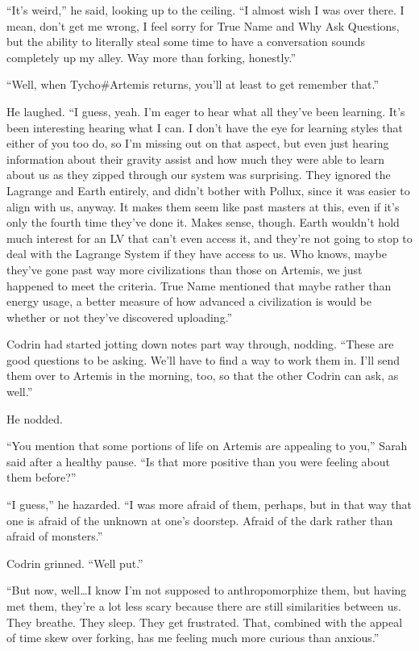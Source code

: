 ``It's weird,'' he said, looking up to the ceiling. ``I almost wish I was over there. I mean, don't get me wrong, I feel sorry for True Name and Why Ask Questions, but the ability to literally steal some time to have a conversation sounds completely up my alley. Way more than forking, honestly.''

``Well, when Tycho\#Artemis returns, you'll at least to get remember that.''

He laughed. ``I guess, yeah. I'm eager to hear what all they've been learning. It's been interesting hearing what I can. I don't have the eye for learning styles that either of you too do, so I'm missing out on that aspect, but even just hearing information about their gravity assist and how much they were able to learn about us as they zipped through our system was surprising. They ignored the Lagrange and Earth entirely, and didn't bother with Pollux, since it was easier to align with us, anyway. It makes them seem like past masters at this, even if it's only the fourth time they've done it. Makes sense, though. Earth wouldn't hold much interest for an LV that can't even access it, and they're not going to stop to deal with the Lagrange System if they have access to us. Who knows, maybe they've gone past way more civilizations than those on Artemis, we just happened to meet the criteria. True Name mentioned that maybe rather than energy usage, a better measure of how advanced a civilization is would be whether or not they've discovered uploading.''

Codrin had started jotting down notes part way through, nodding. ``These are good questions to be asking. We'll have to find a way to work them in. I'll send them over to Artemis in the morning, too, so that the other Codrin can ask, as well.''

He nodded.

``You mention that some portions of life on Artemis are appealing to you,'' Sarah said after a healthy pause. ``Is that more positive than you were feeling about them before?''

``I guess,'' he hazarded. ``I was more afraid of them, perhaps, but in that way that one is afraid of the unknown at one's doorstep. Afraid of the dark rather than afraid of monsters.''

Codrin grinned. ``Well put.''

``But now, well\ldots I know I'm not supposed to anthropomorphize them, but having met them, they're a lot less scary because there are still similarities between us. They breathe. They sleep. They get frustrated. That, combined with the appeal of time skew over forking, has me feeling much more curious than anxious.''


